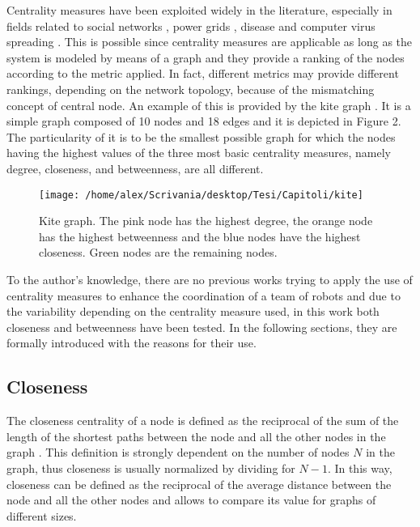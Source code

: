 Centrality measures have been exploited widely in the literature,
especially in fields related to social networks \cite{Freeman1978},
power grids \cite{Nasiruzzaman2011}, disease \cite{Dekker2013} and computer
virus spreading \cite{Wang2018}. This is possible since centrality measures
are applicable as long as the system is modeled by means of a graph
and they provide a ranking of the nodes according to the metric applied.
In fact, different metrics may provide different rankings, depending
on the network topology, because of the mismatching concept of central
node. An example of this is provided by the kite graph \cite{Krackhardt1990}.
It is a simple graph composed of 10 nodes and 18 edges and it is depicted
in Figure 2. The particularity of it is to be the smallest possible
graph for which the nodes having the highest values of the three most
basic centrality measures, namely degree, closeness, and betweenness,
are all different. 
\begin{figure}
\texttt{[image: /home/alex/Scrivania/desktop/Tesi/Capitoli/kite]}

\caption{Kite graph. The pink node has the highest degree, the orange node
has the highest betweenness and the blue nodes have the highest closeness.
Green nodes are the remaining nodes.}

\end{figure}

To the author's knowledge, there are no previous works trying to apply
the use of centrality measures to enhance the coordination of a team
of robots and due to the variability depending on the centrality measure
used, in this work both closeness and betweenness have been tested.
In the following sections, they are formally introduced with the reasons
for their use.

\subsection{Closeness}

The closeness centrality of a node is defined as the reciprocal of
the sum of the length of the shortest paths between the node and all
the other nodes in the graph \cite{Freeman1978}. This definition
is strongly dependent on the number of nodes $N$ in the graph, thus
closeness is usually normalized by dividing for $N-1$. In this way,
closeness can be defined as the reciprocal of the average distance
between the node and all the other nodes and allows to compare its
value for graphs of different sizes. 

